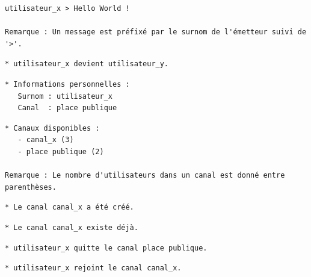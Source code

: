 \medskip
\begin{lstlisting}[caption={\normalsize{Exemple de message transmis dans le chat.}},label={sec:ihm:message:message}]
utilisateur_x > Hello World !

Remarque : Un message est préfixé par le surnom de l'émetteur suivi de '>'.
\end{lstlisting}

\medskip
\begin{lstlisting}[caption={\normalsize{Exemple de message de changement de surnom d'un utilisateur.}},label={sec:ihm:message:surnom}]
* utilisateur_x devient utilisateur_y.
\end{lstlisting}

\medskip
\begin{lstlisting}[caption={\normalsize{Exemple de message sur des informations personnelles.}},label={sec:ihm:message:infoperso}]
* Informations personnelles : 
   Surnom : utilisateur_x
   Canal  : place publique
\end{lstlisting}

\medskip
\begin{lstlisting}[caption={\normalsize{Exemple de message sur des informations sur les canaux.}},label={sec:ihm:message:infocanaux}]
* Canaux disponibles : 
   - canal_x (3)
   - place publique (2)

Remarque : Le nombre d'utilisateurs dans un canal est donné entre parenthèses.
\end{lstlisting}

\medskip
\begin{lstlisting}[caption={\normalsize{Exemple de message de création de canal.}},label={sec:ihm:message:canalcreation}]
* Le canal canal_x a été créé.
\end{lstlisting}

\medskip
\begin{lstlisting}[caption={\normalsize{Exemple de message de création impossible de canal {\footnotesize(le canal existe déjà)}.}},label={sec:ihm:message:}]
* Le canal canal_x existe déjà.
\end{lstlisting}

\medskip
\begin{lstlisting}[caption={\normalsize{Exemple de message de départ d'un canal.}},label={sec:ihm:message:canaldepart}]
* utilisateur_x quitte le canal place publique.
\end{lstlisting}

\medskip
\begin{lstlisting}[caption={\normalsize{Exemple de message d'arrivée dans un canal.}},label={sec:ihm:message:canalarrivee}]
* utilisateur_x rejoint le canal canal_x.
\end{lstlisting}


